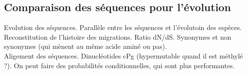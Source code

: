 \documentclass[10pt,a4paper]{article}
\begin{document}
\subsection{Comparaison des séquences pour l'évolution}
Evolution des séquences. Parallèle entre les séquences et l'évolutoin des espèces.\\
Reconstitution de l'histoire des migrations. Ratio dN/dS. Synonymes et non synonymes (qui mènent au même acide aminé ou pas).\\
Aligement des séquences. Dinucléotides cPg (hypermutable quand il est méthylé ?). On peut faire des probabilités conditionnelles, qui sont plus performantes.\\
\end{document}
